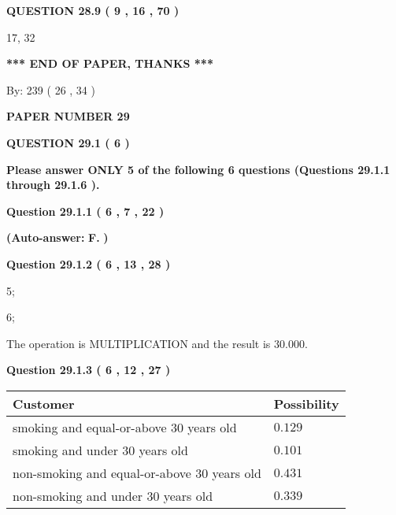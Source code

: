 \documentclass[12pt]{article}
\begin{document}
 
  
  
{\textbf{\large{QUESTION
28.9 
 (           9 ,          16 ,          70 )
}}}

17,  %
32
 
   
   
   
   
\vspace{1.0in} 
{\textbf{\large{ *** END OF PAPER, THANKS *** }}} 
   
   
\hspace{1.0in} By: 
         239 (          26 ,           34 )
   
   
   
   
\newpage 
\setcounter{page}{ 
    29001 } 
   
   
 {\textbf{ \Large{ PAPER NUMBER           29  }}}
   
   
   
   
  
\vspace{0.2in}
  
{\textbf{\Large{QUESTION
29.1 
 (           6 )
}}}
  
  
{\textbf{\Large{Please answer ONLY  %
           5  %
 of the following  %
           6  %
 questions (Questions  %
29.1.1 %
 through  %
29.1.6 %
 ). }}}
   
   
  
  
{\textbf{\large{Question
29.1.1 
 (           6 ,           7 ,          22 )
}}}
 
 
{\textbf{(Auto-answer:}}
{\textbf{\large{
F.}}}
{\textbf{)}}
 
 
  
  
{\textbf{\large{Question
29.1.2 
 (           6 ,          13 ,          28 )
}}}

5;
 
6;
 
The operation is  %
MULTIPLICATION and the result is
$ %
30.000$.
 
  
  
{\textbf{\large{Question
29.1.3 
 (           6 ,          12 ,          27 )
}}}

 
\noindent
\begin{tabular}{|l|l|}
\hline
Customer & Possibility \\
\hline
smoking  and  %
equal-or-above 30 years old &
  $ %
0.129$ \\
\hline
smoking  and  %
under 30 years old &
  $ %
0.101$ \\
\hline
 non-smoking and  %
equal-or-above 30 years old &
  $ %
0.431$ \\
\hline
 non-smoking and  %
under 30 years old &
  $ %
0.339$ \\
\hline
\end{tabular}
 
\end{document}
